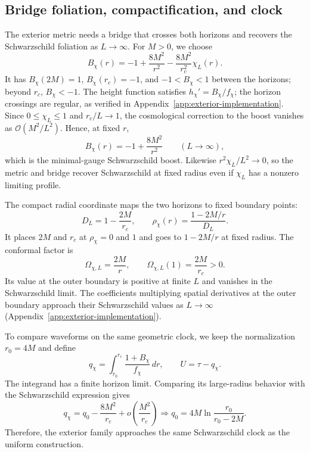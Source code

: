 \documentclass[
 aps,
 prd,
 reprint,
 superscriptaddress,
 nofootinbib,
 longbibliography
]{revtex4-2}
\begin{document}
\subsection{Bridge foliation, compactification, and clock}

The exterior metric needs a bridge that crosses both horizons and recovers
the Schwarzschild foliation as $L\to\infty$.  For $M>0$, we choose
\begin{equation}
 B_\chi(r)=-1+\frac{8M^2}{r^2}
 -\frac{8M^2}{r_c^2}\chi_L(r).
 \label{eq:exterior_bridge}
\end{equation}
It has $B_\chi(2M)=1$, $B_\chi(r_c)=-1$, and $-1<B_\chi<1$ between the
horizons; beyond $r_c$, $B_\chi<-1$.  The height function satisfies
$h_\chi'=B_\chi/f_\chi$; the horizon crossings are regular, as verified in
Appendix~\ref{app:exterior-implementation}.  Since $0\leq\chi_L\leq1$ and
$r_c/L\to1$, the cosmological correction to the boost vanishes as
$\mathcal O(M^2/L^2)$.  Hence, at fixed $r$,
\begin{equation}
 B_\chi(r)=-1+\frac{8M^2}{r^2}
 \qquad(L\to\infty),
 \label{eq:exterior_bridge_flat_limit}
\end{equation}
which is the minimal-gauge Schwarzschild boost.  Likewise
$r^2\chi_L/L^2\to0$, so the
metric and bridge recover Schwarzschild at fixed radius even if $\chi_L$ has
a nonzero limiting profile.

The compact radial coordinate maps the two horizons to fixed boundary points:
\begin{equation}
 D_L=1-\frac{2M}{r_c},
 \qquad
 \rho_\chi(r)=\frac{1-2M/r}{D_L}.
 \label{eq:exterior_compactification}
\end{equation}
It places $2M$ and $r_c$ at $\rho_\chi=0$ and $1$ and goes to
$1-2M/r$ at fixed radius.  The conformal factor is
\begin{equation}
 \Omega_{\chi,L}=\frac{2M}{r},
 \qquad \Omega_{\chi,L}(1)=\frac{2M}{r_c}>0.
 \label{eq:exterior_conformal_factor}
\end{equation}
Its value at the outer boundary is positive at finite $L$ and vanishes in the
Schwarzschild limit. The coefficients multiplying spatial derivatives at the outer boundary
approach their Schwarzschild values as $L\to\infty$
(Appendix~\ref{app:exterior-implementation}).  

To compare waveforms on the same geometric clock, we keep the normalization
$r_0=4M$ and define
\begin{equation}
 q_\chi=\int_{r_0}^{r_c}\frac{1+B_\chi}{f_\chi}\,dr,
 \qquad U=\tau-q_\chi.
 \label{eq:exterior_clock}
\end{equation}
The integrand has a finite horizon limit.  Comparing its large-radius
behavior with the Schwarzschild expression gives
\begin{equation}
 q_\chi=q_0-\frac{8M^2}{r_c}
 +o\!\left(\frac{M^2}{r_c}\right)
 \Rightarrow q_0=4M\ln\frac{r_0}{r_0-2M}.
 \label{eq:exterior_clock_flat_limit}
\end{equation}
Therefore, the exterior family approaches the same Schwarzschild clock as the
uniform construction.
\end{document}
